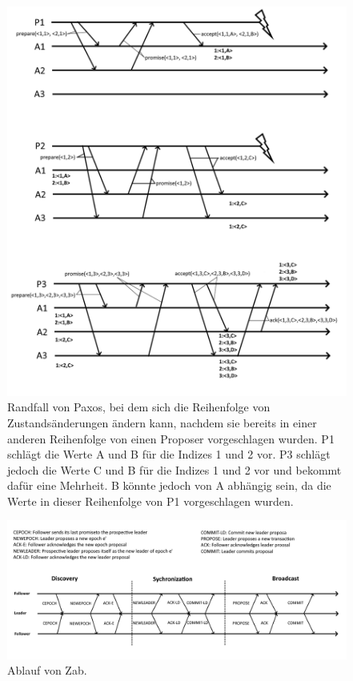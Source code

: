 \begin{figure}[p]
	\centering
	\includegraphics[width=\linewidth]{img/paxos_fail_2.png}
	\caption{Randfall von Paxos, bei dem sich die Reihenfolge von Zustandsänderungen ändern kann, nachdem sie bereits in einer anderen Reihenfolge von einen Proposer vorgeschlagen wurden. P1 schlägt die Werte A und B für die Indizes 1 und 2 vor. P3 schlägt jedoch die Werte C und B für die Indizes 1 und 2 vor und bekommt dafür eine Mehrheit. B könnte jedoch von A abhängig sein, da die Werte in dieser Reihenfolge von P1 vorgeschlagen wurden.}
	\label{fig:paxos_fail}
\end{figure}

\begin{figure}[H]
	\centering
	\includegraphics[width=\linewidth]{img/zab.png}
	\caption{Ablauf von Zab.}
	\label{fig:zab}
\end{figure}


